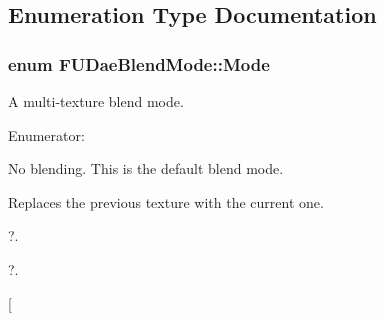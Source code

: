 \subsection{Enumeration Type Documentation}
\hypertarget{namespaceFUDaeBlendMode_a4b5f740c497b45148449914ab987d2c1}{
\subsubsection[{Mode}]{\setlength{\rightskip}{0pt plus 5cm}enum {\bf FUDaeBlendMode::Mode}}}
\label{namespaceFUDaeBlendMode_a4b5f740c497b45148449914ab987d2c1}
A multi-\/texture blend mode. \begin{Desc}
\item[Enumerator: ]\par
\begin{description}
\item[{\em 
\hypertarget{namespaceFUDaeBlendMode_a4b5f740c497b45148449914ab987d2c1a1f309ed4c3d0f83edb527d9715541da6}{
NONE}
\label{namespaceFUDaeBlendMode_a4b5f740c497b45148449914ab987d2c1a1f309ed4c3d0f83edb527d9715541da6}
}]No blending. This is the default blend mode. \item[{\em 
\hypertarget{namespaceFUDaeBlendMode_a4b5f740c497b45148449914ab987d2c1a0b8bf8120e6dbe2ac50e98fa7f817922}{
OVER}
\label{namespaceFUDaeBlendMode_a4b5f740c497b45148449914ab987d2c1a0b8bf8120e6dbe2ac50e98fa7f817922}
}]Replaces the previous texture with the current one. \item[{\em 
\hypertarget{namespaceFUDaeBlendMode_a4b5f740c497b45148449914ab987d2c1a48a0c7eb514f06eecbdb54eedcf7affe}{
IN}
\label{namespaceFUDaeBlendMode_a4b5f740c497b45148449914ab987d2c1a48a0c7eb514f06eecbdb54eedcf7affe}
}]?. \item[{\em 
\hypertarget{namespaceFUDaeBlendMode_a4b5f740c497b45148449914ab987d2c1a1189f04dd3eb88ef54b8d108458338da}{
OUT}
\label{namespaceFUDaeBlendMode_a4b5f740c497b45148449914ab987d2c1a1189f04dd3eb88ef54b8d108458338da}
}]?. \item[{\em 
}
\end{description}
\end{Desc}
